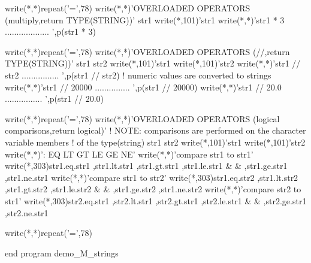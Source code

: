 \begin{DoxyVerb}
  write(*,*)repeat('=',78)
  write(*,*)'OVERLOADED OPERATORS (multiply,return TYPE(STRING))'
  str1%
  write(*,101)'str1%
  write(*,*)'str1 * 3 ................... ',p(str1 * 3)

  write(*,*)repeat('=',78)
  write(*,*)'OVERLOADED OPERATORS (//,return TYPE(STRING))'
  str1%
  str2%
  write(*,101)'str1%
  write(*,101)'str2%
  write(*,*)'str1 // str2 ................ ',p(str1 // str2)
  ! numeric values are converted to strings
  write(*,*)'str1 // 20000 ............... ',p(str1 // 20000)
  write(*,*)'str1 // 20.0 ................ ',p(str1 // 20.0)

  write(*,*)repeat('=',78)
  write(*,*)'OVERLOADED OPERATORS (logical comparisons,return logical)'
  ! NOTE: comparisons are performed on the character variable members
  !       of the type(string)
  str1%
  str2%
  write(*,101)'str1%
  write(*,101)'str2%
  write(*,*)': EQ LT GT LE GE NE'
  write(*,*)'compare str1 to str1'
  write(*,303)str1.eq.str1  ,str1.lt.str1  ,str1.gt.str1  ,str1.le.str1 &
             & ,str1.ge.str1  ,str1.ne.str1
  write(*,*)'compare str1 to str2'
  write(*,303)str1.eq.str2  ,str1.lt.str2  ,str1.gt.str2  ,str1.le.str2 &
             & ,str1.ge.str2  ,str1.ne.str2
  write(*,*)'compare str2 to str1'
  write(*,303)str2.eq.str1  ,str2.lt.str1  ,str2.gt.str1  ,str2.le.str1 &
             & ,str2.ge.str1  ,str2.ne.str1

  write(*,*)repeat('=',78)

end program demo_M_strings
\end{DoxyVerb}


